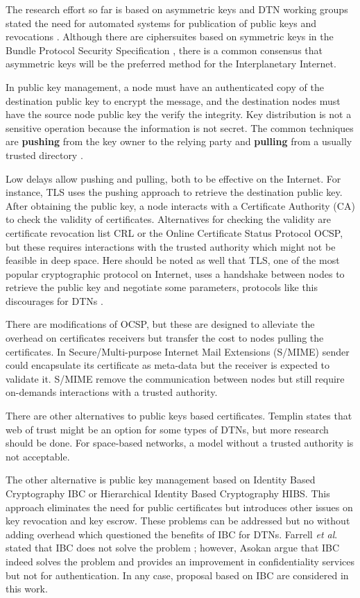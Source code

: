 The research effort so far is based on asymmetric keys and DTN working groups stated the need for automated systems for publication of public keys and revocations \cite{templin-dtnskmps-00}. Although there are ciphersuites based on symmetric keys in the Bundle Protocol Security Specification \cite{ietf-dtn-bpsec-07}, there is a common consensus that asymmetric keys will be the preferred method for the Interplanetary Internet. 

In public key management, a node must have an authenticated copy of the destination public key to encrypt the message, and the destination nodes must have the source node public key the verify the integrity. Key distribution is not a sensitive operation because the information is not secret. The common techniques are \textbf{pushing} from the key owner to the relying party and \textbf{pulling} from a usually trusted directory \cite{martineveryday}.

Low delays allow pushing and pulling, both to be effective on the Internet. For instance, TLS uses the pushing approach to retrieve the destination public key. After obtaining the public key, a node interacts with a Certificate Authority (CA) to check the validity of certificates. Alternatives for checking the validity are certificate revocation list CRL or the Online Certificate Status Protocol OCSP, but these requires interactions with the trusted authority which might not be feasible in deep space. Here should be noted as well that TLS, one of the most popular cryptographic protocol on Internet, uses a handshake between nodes to retrieve the public key and negotiate some parameters, protocols like this discourages for DTNs \cite{fall2003delay}.

There are modifications of OCSP, but these are designed to alleviate the overhead on certificates receivers but transfer the cost to nodes pulling the certificates. In Secure/Multi-purpose Internet Mail Extensions (S/MIME) sender could encapsulate its certificate as meta-data but the receiver is expected to validate it. S/MIME remove the communication between nodes but still require on-demands interactions with a trusted authority.

There are other alternatives to public keys based certificates. Templin \cite{templin-dtnskmps-00} states that web of trust might be an option for some types of DTNs, but more research should be done. For space-based networks, a model without a trusted authority is not acceptable. 

The other alternative is public key management based on Identity Based Cryptography IBC or Hierarchical Identity Based Cryptography HIBS. This approach eliminates the need for public certificates but introduces other issues on key revocation and key escrow. These problems can be addressed but no without adding overhead which questioned the benefits of IBC for DTNs. Farrell \textit{et al}. stated that IBC does not solve the problem \cite{irtf-dtnrg-sec-overview-06}; however, Asokan \cite{asokan2007towards} argue that IBC indeed solves the problem and provides an improvement in confidentiality services but not for authentication. In any case, proposal based on IBC are considered in this work.      


